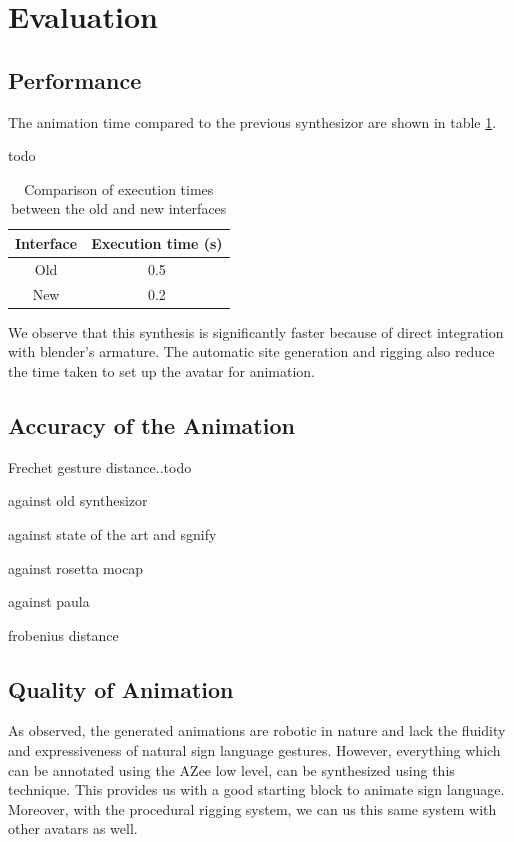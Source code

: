 \documentclass[../../main.tex]{subfiles}
\begin{document}
\section{Evaluation}
\label{ch:rigging_layers:evaluation}

\subsection{Performance}
\label{ch:rigging_layers:evaluation:performance}

The animation time compared to the previous synthesizor are shown in table \ref{tab:faster_executions}.

todo
\begin{table}
    \centering
    \begin{tabular}{|c|c|}
        \hline
        \textbf{Interface} & \textbf{Execution time (s)} \\
        \hline
        Old & 0.5 \\
        New & 0.2 \\
        \hline
    \end{tabular}
    \caption{Comparison of execution times between the old and new interfaces}
    \label{tab:faster_executions}
\end{table}

We observe that this synthesis is significantly faster because of direct integration with blender's armature. The automatic site generation and rigging also reduce the time taken to set up the avatar for animation.

\subsection{Accuracy of the Animation}
\label{ch:rigging_layers:evaluation:accuracy}

Frechet gesture distance..todo

against old synthesizor

against state of the art and sgnify

against rosetta mocap

against paula

frobenius distance

\subsection{Quality of Animation}
\label{ch:rigging_layers:evaluation:quality}

As observed, the generated animations are robotic in nature and lack the fluidity and expressiveness of natural sign language gestures. However, everything which can be annotated using the AZee low level, can be synthesized using this technique. This provides us with a good starting block to animate sign language. Moreover, with the procedural rigging system, we can us this same system with other avatars as well.
\end{document}
